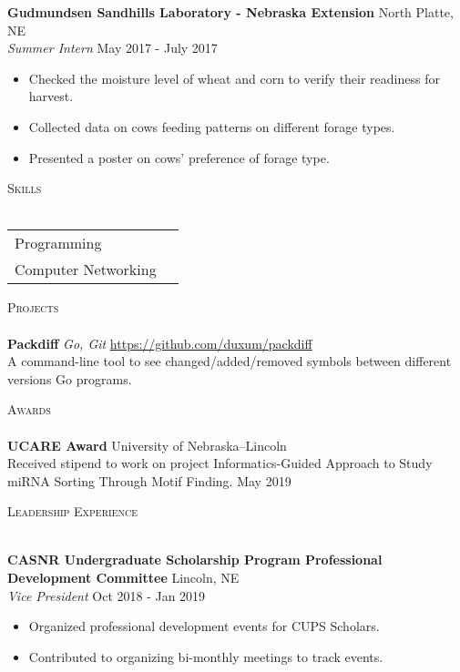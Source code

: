 \documentclass[a4paper]{article}
\newcommand{\lineunder} {
    \vspace*{-8pt} \\
    \hspace*{-18pt} \hrulefill \\
}
\newcommand{\header} [1] {
    {\hspace*{-18pt}\vspace*{6pt} \textsc{#1}}
    \vspace*{-6pt} \lineunder
}
\begin{document}
\textbf{Gudmundsen Sandhills Laboratory - Nebraska Extension} \hfill North Platte, NE\\
\textit{Summer Intern} \hfill May 2017 - July 2017\\
\vspace{-1mm}
\begin{itemize} \itemsep 1pt
	\item Checked the moisture level of wheat and corn to verify their readiness for harvest.
	\item Collected data on cows feeding patterns on different forage types.
	\item Presented a poster on cows’ preference of forage type.
\end{itemize}

\header{Skills}
\begin{tabular}{ l l }
	Programming\\
	Computer Networking\\
\end{tabular}
\vspace{2mm}

\header{Projects}
{\textbf{Packdiff}} {\sl Go, Git} \hfill \url{https://github.com/duxum/packdiff}\\
A command-line tool to see changed/added/removed symbols between different versions Go programs.\\
\vspace*{2mm}

\header{Awards}
\textbf{UCARE Award} \hfill University of Nebraska–Lincoln\\
Received stipend to work on project \textquotedbl{}Informatics-Guided Approach to Study miRNA Sorting Through Motif Finding\textquotedbl{}. \hfill May 2019\\
\vspace*{2mm}

\header{Leadership Experience}
\vspace{1mm}

\textbf{CASNR Undergraduate Scholarship Program Professional Development Committee} \hfill Lincoln, NE\\
\textit{Vice President} \hfill Oct 2018 - Jan 2019\\
\vspace{-1mm}
\begin{itemize} \itemsep 1pt
	\item Organized professional development events for CUPS Scholars.
	\item Contributed to organizing bi-monthly meetings to track events.
\end{itemize}

\
\end{document}
